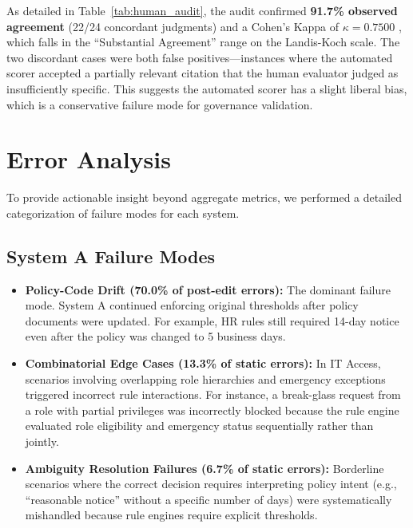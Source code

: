 \documentclass[sigconf,screen]{acmart}
\begin{document}
As detailed in Table~\ref{tab:human_audit}, the audit confirmed \textbf{91.7\% observed agreement} (22/24 concordant judgments) and a Cohen's Kappa of $\kappa = 0.7500$ \cite{cohen1960coefficient}, which falls in the ``Substantial Agreement'' range on the Landis-Koch scale. The two discordant cases were both false positives---instances where the automated scorer accepted a partially relevant citation that the human evaluator judged as insufficiently specific. This suggests the automated scorer has a slight liberal bias, which is a conservative failure mode for governance validation.

\section{Error Analysis}
To provide actionable insight beyond aggregate metrics, we performed a detailed categorization of failure modes for each system.

\subsection{System A Failure Modes}
\begin{itemize}[leftmargin=*]
    \item \textbf{Policy-Code Drift (70.0\% of post-edit errors):} The dominant failure mode. System A continued enforcing original thresholds after policy documents were updated. For example, HR rules still required 14-day notice even after the policy was changed to 5 business days.
    \item \textbf{Combinatorial Edge Cases (13.3\% of static errors):} In IT Access, scenarios involving overlapping role hierarchies and emergency exceptions triggered incorrect rule interactions. For instance, a break-glass request from a role with partial privileges was incorrectly blocked because the rule engine evaluated role eligibility and emergency status sequentially rather than jointly.
    \item \textbf{Ambiguity Resolution Failures (6.7\% of static errors):} Borderline scenarios where the correct decision requires interpreting policy intent (e.g., ``reasonable notice'' without a specific number of days) were systematically mishandled because rule engines require explicit thresholds.
\end{itemize}
\end{document}
